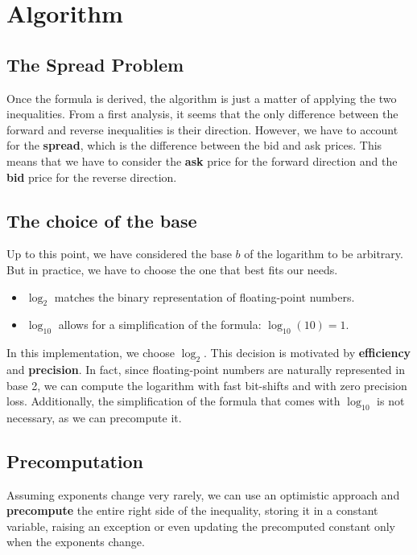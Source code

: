 \documentclass[11pt]{article}
\begin{document}
\section{Algorithm}

\subsection{The Spread Problem}
Once the formula is derived, the algorithm is just a matter of applying the two inequalities. From a first analysis, it seems that the only difference between the forward and reverse inequalities is their direction. However, we have to account for the \textbf{spread}, which is the difference between the bid and ask prices. This means that we have to consider the \textbf{ask} price for the forward direction and the \textbf{bid} price for the reverse direction.

\subsection{The choice of the base}
Up to this point, we have considered the base $b$ of the logarithm to be arbitrary. But in practice, we have to choose the one that best fits our needs.
\begin{itemize}
    \item $\log_{2}$ matches the binary representation of floating-point numbers.
    \item $\log_{10}$ allows for a simplification of the formula: $\log_{10}(10) = 1$.
\end{itemize}
In this implementation, we choose $\log_{2}$. This decision is motivated by \textbf{efficiency} and \textbf{precision}. In fact, since floating-point numbers are naturally represented in base 2, we can compute the logarithm with fast bit-shifts and with zero precision loss. Additionally, the simplification of the formula that comes with $\log_{10}$ is not necessary, as we can precompute it.

\subsection{Precomputation}
Assuming exponents change very rarely, we can use an optimistic approach and \textbf{precompute} the entire right side of the inequality, storing it in a constant variable, raising an exception or even updating the precomputed constant only when the exponents change.
\end{document}
